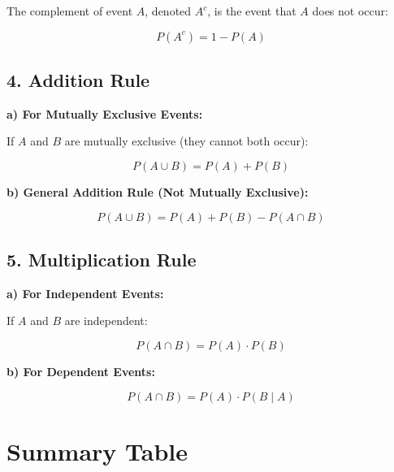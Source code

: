 \documentclass{article}
\begin{document}
The complement of event \( A \), denoted \( A^c \), is the event that \( A \) does not occur:

\[
P(A^c) = 1 - P(A)
\]

\subsection*{4. Addition Rule}

\textbf{a) For Mutually Exclusive Events:}

If \( A \) and \( B \) are mutually exclusive (they cannot both occur):

\[
P(A \cup B) = P(A) + P(B)
\]

\textbf{b) General Addition Rule (Not Mutually Exclusive):}

\[
P(A \cup B) = P(A) + P(B) - P(A \cap B)
\]

\subsection*{5. Multiplication Rule}

\textbf{a) For Independent Events:}

If \( A \) and \( B \) are independent:

\[
P(A \cap B) = P(A) \cdot P(B)
\]

\textbf{b) For Dependent Events:}

\[
P(A \cap B) = P(A) \cdot P(B \mid A)
\]

\bigskip

\section*{Summary Table}
\end{document}
